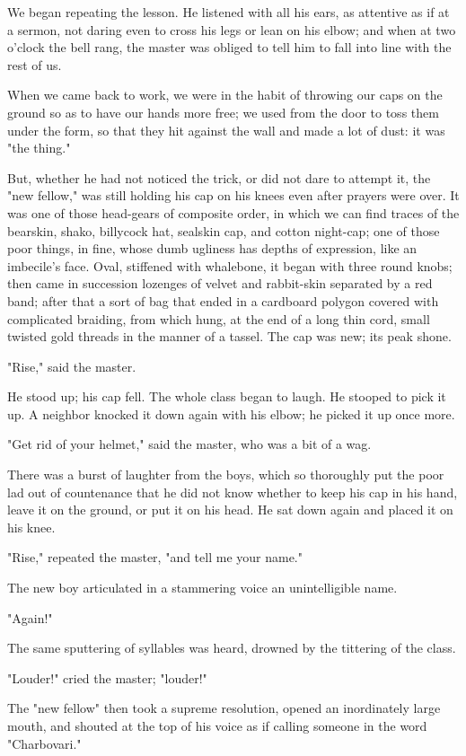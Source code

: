 \documentclass[11pt,twocolumn]{ltugboat}
\begin{document}
We began repeating the lesson. He listened with all his ears, as
attentive as if at a sermon, not daring even to cross his legs or lean
on his elbow; and when at two o'clock the bell rang, the master was
obliged to tell him to fall into line with the rest of us.

When we came back to work, we were in the habit of throwing our caps on
the ground so as to have our hands more free; we used from the door to
toss them under the form, so that they hit against the wall and made a
lot of dust: it was "the thing."

But, whether he had not noticed the trick, or did not dare to attempt
it, the "new fellow," was still holding his cap on his knees even after
prayers were over. It was one of those head-gears of composite order, in
which we can find traces of the bearskin, shako, billycock hat, sealskin
cap, and cotton night-cap; one of those poor things, in fine, whose
dumb ugliness has depths of expression, like an imbecile's face. Oval,
stiffened with whalebone, it began with three round knobs; then came in
succession lozenges of velvet and rabbit-skin separated by a red band;
after that a sort of bag that ended in a cardboard polygon covered with
complicated braiding, from which hung, at the end of a long thin cord,
small twisted gold threads in the manner of a tassel. The cap was new;
its peak shone.

"Rise," said the master.

He stood up; his cap fell. The whole class began to laugh. He stooped to
pick it up. A neighbor knocked it down again with his elbow; he picked
it up once more.

"Get rid of your helmet," said the master, who was a bit of a wag.

There was a burst of laughter from the boys, which so thoroughly put the
poor lad out of countenance that he did not know whether to keep his cap
in his hand, leave it on the ground, or put it on his head. He sat down
again and placed it on his knee.

"Rise," repeated the master, "and tell me your name."

The new boy articulated in a stammering voice an unintelligible name.

"Again!"

The same sputtering of syllables was heard, drowned by the tittering of
the class.

"Louder!" cried the master; "louder!"

The "new fellow" then took a supreme resolution, opened an inordinately
large mouth, and shouted at the top of his voice as if calling someone
in the word "Charbovari."
\end{document}
